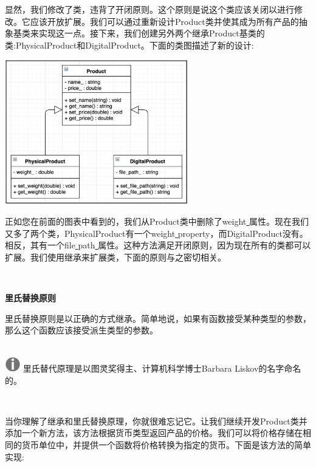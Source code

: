 显然，我们修改了类，违背了开闭原则。这个原则是说这个类应该关闭以进行修改。它应该开放扩展。我们可以通过重新设计Product类并使其成为所有产品的抽象基类来实现这一点。接下来，我们创建另外两个继承Product基类的类:PhysicalProduct和DigitalProduct。下面的类图描述了新的设计: \par

\begin{center}
	\includegraphics[width=0.6\textwidth]{content/Section-2/Chapter-10/10}
\end{center}

正如您在前面的图表中看到的，我们从Product类中删除了weight\underline{ }属性。现在我们又多了两个类，PhysicalProduct有一个weight\underline{ }property，而DigitalProduct没有。相反，其有一个file\underline{ }path\underline{ }属性。这种方法满足开闭原则，因为现在所有的类都可以扩展。我们使用继承来扩展类，下面的原则与之密切相关。 \par

\noindent\textbf{}\ \par
\textbf{里氏替换原则} \ \par
里氏替换原则是以正确的方式继承。简单地说，如果有函数接受某种类型的参数，那么这个函数应该接受派生类型的参数。 \par

\hspace*{\fill} \\ %
\includegraphics[width=0.05\textwidth]{images/warn}
里氏替代原理是以图灵奖得主、计算机科学博士Barbara Liskov的名字命名的。 \par
\noindent\textbf{}\ \par

当你理解了继承和里氏替换原理，你就很难忘记它。让我们继续开发Product类并添加一个新方法，该方法根据货币类型返回产品的价格。我们可以将价格存储在相同的货币单位中，并提供一个函数将价格转换为指定的货币。下面是该方法的简单实现: \par

